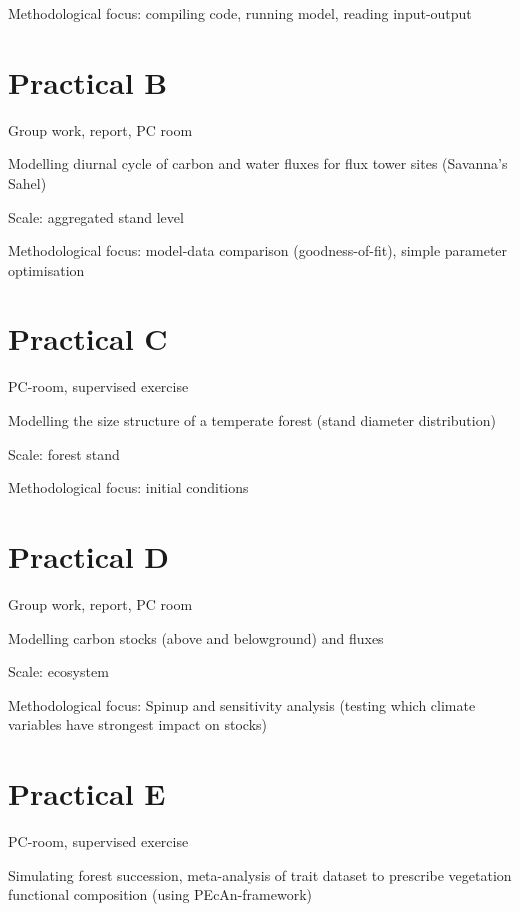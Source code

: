 \documentclass[]{book}
\begin{document}
Methodological focus: compiling code, running model, reading
input-output

\chapter*{Practical B}\label{practical-b}

Group work, report, PC room

Modelling diurnal cycle of carbon and water fluxes for flux tower sites
(Savanna's Sahel)

Scale: aggregated stand level

Methodological focus: model-data comparison (goodness-of-fit), simple
parameter optimisation

\chapter*{Practical C}\label{practical-c}

PC-room, supervised exercise

Modelling the size structure of a temperate forest (stand diameter
distribution)

Scale: forest stand

Methodological focus: initial conditions

\chapter*{Practical D}\label{practical-d}

Group work, report, PC room

Modelling carbon stocks (above and belowground) and fluxes

Scale: ecosystem

Methodological focus: Spinup and sensitivity analysis (testing which
climate variables have strongest impact on stocks)

\chapter*{Practical E}\label{practical-e}

PC-room, supervised exercise

Simulating forest succession, meta-analysis of trait dataset to
prescribe vegetation functional composition (using PEcAn-framework)
\end{document}
